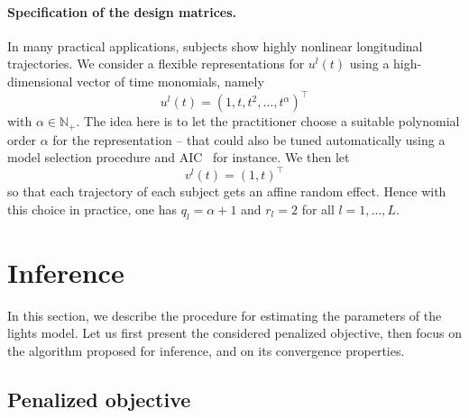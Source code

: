 \documentclass[11pt]{article}
\newcommand{\N}{\mathds N}
\begin{document}
\paragraph{Specification of the design matrices.}
 
In many practical applications, subjects show highly nonlinear longitudinal trajectories. We consider a flexible representations for $u^l(t)$ using a high-dimensional vector of time monomials, namely 
\begin{equation}
  \label{eq:alpha-def}
  u^l(t) = (1, t, t^2, \ldots, t^\alpha)^\top
\end{equation}
with $\alpha \in \N_+$.
The idea here is to let the practitioner choose a suitable polynomial order $\alpha$ for the representation -- that could also be tuned automatically using a model selection procedure and AIC~\citep{akaike1974new} for instance.
We then let \[v^l(t) = (1, t)^\top\] so that each trajectory of each subject gets an affine random effect. Hence with this choice in practice, one has $q_l=\alpha + 1$ and $r_l=2$ for all $l=1, \ldots, L$.

\section{Inference}
\label{sec:inference}

In this section, we describe the procedure for estimating the parameters of the lights model. Let us first present the considered penalized objective, then focus on the algorithm proposed for inference, and on its convergence properties.

\subsection{Penalized objective}
\label{sec:penalized-obj}
\end{document}
